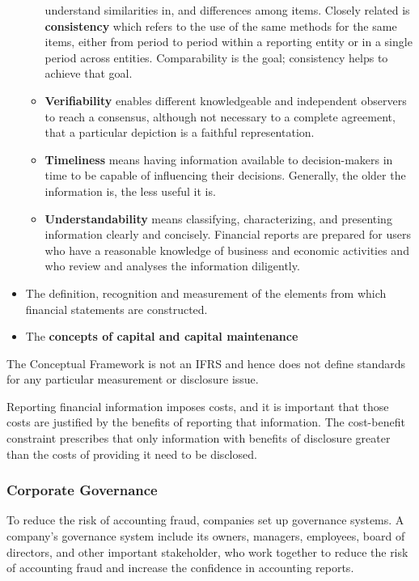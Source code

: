 \documentclass[../main.tex]{subfiles}
\begin{document}
\begin{itemize}[noitemsep]
\begin{itemize}[noitemsep]
			understand similarities in, and differences among items. Closely 
			related is \textbf{consistency} which refers to the use of the same 
			methods for the same items, either from period to period within a 
			reporting entity or in a single period across entities. 
			Comparability is the goal; consistency helps to achieve that goal.
			\item \textbf{Verifiability} enables different knowledgeable and 
			independent observers to reach a consensus, although not necessary 
			to a complete agreement, that a particular depiction is a faithful 
			representation. 
			\item \textbf{Timeliness} means having information available to 
			decision-makers in time to be capable of influencing their 
			decisions. Generally, the older the information is, the less useful 
			it is. 
			\item \textbf{Understandability} means classifying, characterizing, 
			and presenting information clearly and concisely. Financial reports 
			are prepared for users who have a reasonable knowledge of business 
			and economic activities and who review and analyses the information 
			diligently. 
		\end{itemize}
		\item The definition, recognition and measurement of the elements from 
		which financial statements are constructed. 
		\item The \textbf{concepts of capital and capital maintenance}
	\end{itemize}
	
	The Conceptual Framework is not an IFRS and hence does not define standards 
	for any particular measurement or disclosure issue. 
	
	Reporting financial information imposes costs, and it is important that 
	those costs are justified by the benefits of reporting that information. 
	The cost-benefit constraint prescribes that only information with benefits 
	of disclosure greater than the costs of providing it need to be disclosed. 
	
	\subsubsection{Corporate Governance}
	
	To reduce the risk of accounting fraud, companies set up governance 
	systems. A company's governance system include its owners, managers, 
	employees, board of directors, and other important stakeholder, who work 
	together to reduce the risk of accounting fraud and increase the confidence 
	in accounting reports. 
	
\end{document}
